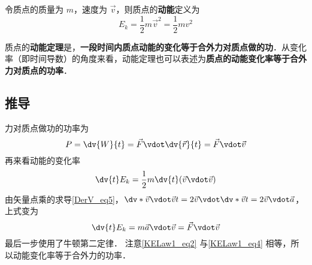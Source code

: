 

令质点的质量为 $m$，速度为 $\vec v$，则质点的\textbf{动能}定义为
\begin{equation}
E_k = \frac 12 m\vec v^2 = \frac 12 mv^2
\end{equation}

质点的\textbf{动能定理}是，\textbf{一段时间内质点动能的变化等于合外力对质点做的功}．从变化率（即时间导数）的角度来看，动能定理也可以表述为\textbf{质点的动能变化率等于合外力对质点的功率}．

\subsection{推导}
力对质点做功的功率为
\begin{equation}\label{KELaw1_eq2}
P = \dv{W}{t} =  \vec F\vdot \dv{\vec r}{t} = \vec F\vdot\vec v
\end{equation}
再来看动能的变化率
\begin{equation}
\dv{t} E_k = \frac 12 m\dv{t} (\vec v\vdot\vec v)
\end{equation}
由矢量点乘的求导\autoref{DerV_eq5}，$\dv*{\vec v\vdot\vec v}{t} = 2\vec v\vdot \dv*{\vec v}{t} = 2\vec v\vdot\vec a$，上式变为
\begin{equation}\label{KELaw1_eq4}
\dv{t} E_k = m\vec a\vdot\vec v = \vec F\vdot\vec v
\end{equation}
最后一步使用了牛顿第二定律．%
注意\autoref{KELaw1_eq2} 与\autoref{KELaw1_eq4} 相等，所以动能变化率等于合外力的功率．